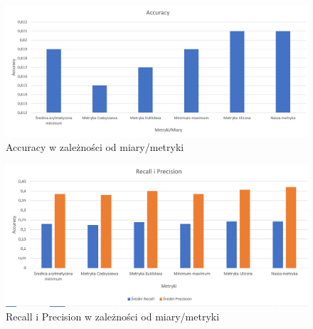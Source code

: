 \documentclass{classrep}
\begin{document}
{\begin{figure}[H]
\caption{Accuracy w zależności od miary/metryki}
\centering
\includegraphics[width=1\textwidth]{i5}
\end{figure}

\begin{figure}[H]
\caption{Recall i Precision w zależności od miary/metryki}
\centering
\includegraphics[width=1\textwidth]{i6}
\end{figure}


}
\end{document}
